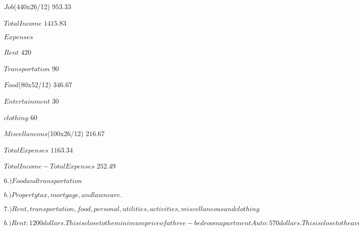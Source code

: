 \documentclass{article}
\begin{document}
\vspace
$Job$(440x26/12)                                      \hfill$953.33$

\vspace
$Total Income$                                        \hfill$1415.83$

\vspace
$Expenses$

\vspace
$Rent$                                                \hfill$420$

\vspace  
$Transportation$                                      \hfill$90$

\vspace
$Food$(80x52/12)                                      \hfill$346.67$

\vspace
$Entertainment$                                       \hfill$30$

\vspace
$clothing$                                            \hfill$60$

\vspace
$Miscellaneous$(100x26/12)                            \hfill$216.67$

\vspace
$Total Expenses$                                      \hfill$1163.34$

\vspace
$Total Income-Total Expenses$                         \hfill$252.49$

\vspace
$6.)Food and transportation$

\vspace
$b.)Property tax, mortgage, and lawn care.$

\vspace
$7.)Rent,transportation,food,personal,utilities,activities,miscellaneous and clothing$

\vspace
$b.)Rent:1200 dollars. This is close to the minimum price of a three-bedroom apartment
    Auto:570 dollars. This is close to the average cost of a car per month driven 15000 miles/year
    Food:350 dollars. With four people in a family, you would expect that food would be at least 300 dollars a week. Especially with two adults and two kids.
    personal:200 dollars. four people in a family, you need to keep clean somehow. I think with two adults and two kids, 200 dollars should be enough for a month.
    Utilities:100 dollars. In our community, electricity is a little more expensive, so utilities is a bit higher than average for an apartment.
    Activities:180 dollars. Taking your kids out for fun will be necessary. They might also bring some friends. Mark and Jen will also want a date night.
    Miscellaneous:130 dollars. You never know especially with two kids what might happen. Field trips or maybe a broken window needs to be fixed in the house.
    Clothing:110 dollars. Kids grow and they will need to get new clothing.$
    
\end{document}
